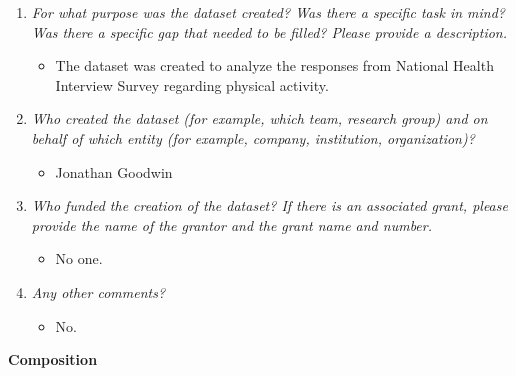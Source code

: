\documentclass[
]{article}
\providecommand{\tightlist}{%
  \setlength{\itemsep}{0pt}\setlength{\parskip}{0pt}}
\begin{document}
\begin{enumerate}
\def\labelenumi{\arabic{enumi}.}
\tightlist
\item
  \emph{For what purpose was the dataset created? Was there a specific
  task in mind? Was there a specific gap that needed to be filled?
  Please provide a description.}

  \begin{itemize}
  \tightlist
  \item
    The dataset was created to analyze the responses from National
    Health Interview Survey regarding physical activity.
  \end{itemize}
\item
  \emph{Who created the dataset (for example, which team, research
  group) and on behalf of which entity (for example, company,
  institution, organization)?}

  \begin{itemize}
  \tightlist
  \item
    Jonathan Goodwin
  \end{itemize}
\item
  \emph{Who funded the creation of the dataset? If there is an
  associated grant, please provide the name of the grantor and the grant
  name and number.}

  \begin{itemize}
  \tightlist
  \item
    No one.
  \end{itemize}
\item
  \emph{Any other comments?}

  \begin{itemize}
  \tightlist
  \item
    No.
  \end{itemize}
\end{enumerate}

\textbf{Composition}
\end{document}
